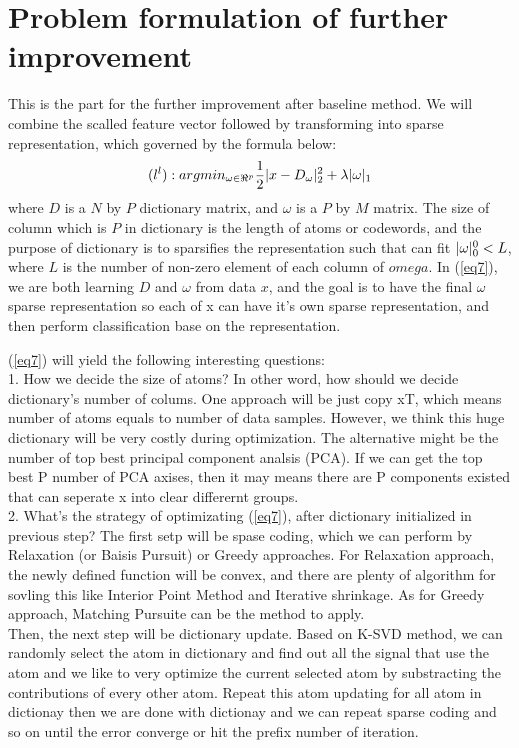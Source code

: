 \documentclass[final]{siamltexmm}
\begin{document}
\section{Problem formulation of further improvement}
This is the part for the further improvement after baseline method. We will combine the scalled feature vector followed by transforming into sparse representation, which governed by the formula below:
\begin{equation}
(l^{l}): argmin_{\omega \in \Re^{p}} \frac{1}{2} \arrowvert x - D_{\omega} \arrowvert_{2}^{2} + \lambda \arrowvert \omega \arrowvert_{1}\label{eq7}
\end{equation}
where $D$ is a $N$ by $P$ dictionary matrix, and $\omega$ is a $P$ by $M$ matrix. The size of column which is $P$ in dictionary is the length of atoms or codewords, and the purpose of dictionary is to sparsifies the representation such that can fit $\arrowvert \omega \arrowvert_{0}^{0} < L$, where $L$ is the number of non-zero element of each column of $omega$.  In (\ref{eq7}), we are both learning $D$ and $\omega$ from data $x$, and the goal is to have the final $\omega$ sparse representation so each of x can have it’s own sparse representation, and then perform classification base on the representation.

(\ref{eq7}) will yield the following interesting questions: \\
1. How we decide the size of atoms? In other word, how should we decide dictionary’s number of colums. One approach will be just copy xT, which means number of atoms equals to number of data samples. However, we think this huge dictionary will be very costly during optimization. The alternative might be the number of top best principal component analsis (PCA). If we can get the top best P number of PCA axises, then it may means there are P components existed that can seperate x into clear differernt groups. \\
2. What’s the strategy of optimizating (\ref{eq7}), after dictionary initialized in previous step? The first setp will be spase coding, which we can perform by Relaxation (or Baisis Pursuit) or Greedy approaches. For Relaxation approach, the newly defined function will be convex, and there are plenty of algorithm for sovling this like Interior Point Method and Iterative shrinkage. As for Greedy approach, Matching Pursuite can be the method to apply. \\

Then, the next step will be dictionary update. Based on K-SVD method, we can randomly select the atom in dictionary and find out all the signal that use the atom and we like to very optimize the current selected atom by substracting the contributions of every other atom. Repeat this atom updating for all atom in dictionay then we are done with dictionay and we can repeat sparse coding and so on until the error converge or hit the prefix number of iteration.
\end{document}
